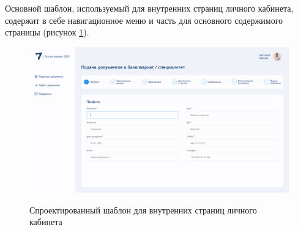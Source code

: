 Основной шаблон, используемый для внутренних страниц личного кабинета, содержит в себе навигационное меню и часть для основного содержимого страницы (рисунок \ref{fig:templatemain}).

\begin{figure}[H]
\begin{center}
\includegraphics[width=1\hsize]{fig/main-layout-design.png}\\[2mm]
\caption{Спроектированный шаблон для внутренних страниц личного кабинета}\label{fig:templatemain}
\end{center}
\end{figure}
